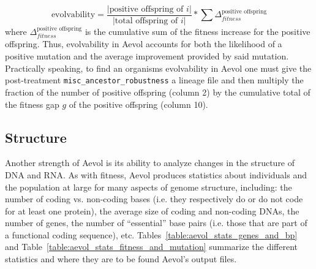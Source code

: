 \begin{equation*}
\text{evolvability} = \frac{|\text{positive offspring of }i|}{|\text{total offspring of }i|}*\sum \Delta^{\text{positive offspring}}_{fitness}
\end{equation*}  where $\Delta^{\text{positive offspring}}_{fitness}$ is the cumulative sum of the fitness increase for the positive offspring. Thus, evolvability in Aevol accounts for both the likelihood of a positive mutation and the average improvement provided by said mutation. Practically speaking, to find an organisms evolvability in Aevol one must give the post-treatment \texttt{misc\_ancestor\_robustness} a lineage file and then multiply the fraction of the number of positive offspring (column 2) by the cumulative total of the fitness gap $g$ of the positive offspring (column 10).


 
\subsection{Structure}\label{methods:structure}
Another strength of Aevol is its ability to analyze changes in the structure of DNA and RNA. As with fitness, Aevol produces statistics about individuals and the population at large for many aspects of genome structure, including: the number of coding vs. non-coding bases (i.e. they respectively do or do not code for at least one protein), the average size of coding and non-coding DNAs, the number of genes, the number of ``essential'' base pairs (i.e. those that are part of a functional coding sequence), etc. Tables~\ref{table:aevol_stats_genes_and_bp} and Table~\ref{table:aevol_stats_fitness_and_mutation} summarize the different statistics and where they are to be found Aevol's output files. 

